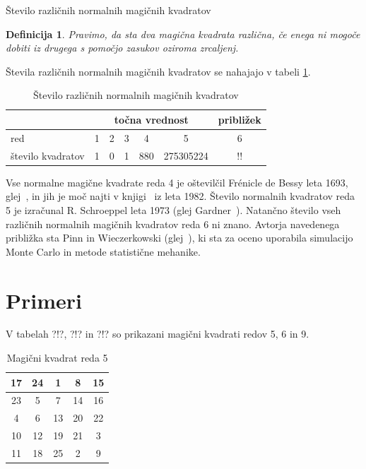 \documentclass[a4paper,12pt]{article}
\newtheorem{definicija}[izrek]{Definicija}
\begin{document}
Število različnih normalnih magičnih kvadratov

\begin{definicija}
      Pravimo, da sta dva magična kvadrata \emph{različna}, če enega ni mogoče dobiti
      iz drugega s pomočjo zasukov oziroma zrcaljenj.
\end{definicija}

Števila različnih normalnih magičnih kvadratov se nahajajo v tabeli \ref{table:stevila}.



\begin{table}
   \centering
   \caption{Število različnih normalnih magičnih kvadratov}
   \label{table:stevila}
   \begin{tabular}{lcccccc}\toprule
         & \multicolumn{5}{c}{točna vrednost} & približek\\
      \midrule
         red & 1 & 2 & 3 & 4 & 5 & 6\\
      število kvadratov & 1 & 0 & 1 & 880 & 275305224 & !!\\
      \bottomrule
\end{tabular}
\end{table}


Vse normalne magične kvadrate reda 4 je oštevilčil Frénicle de Bessy
leta 1693, glej~\cite{bessy}, in jih je moč najti v knjigi~\cite{berlekamp}
iz leta 1982. Število normalnih kvadratov reda 5 je izračunal
R. Schroeppel leta 1973 (glej Gardner~\cite{gardner}).
Natančno število vseh različnih normalnih magičnih kvadratov reda 6 ni znano.
Avtorja navedenega približka sta Pinn in Wieczerkowski (glej~\cite{pinn}), ki
sta za oceno uporabila simulacijo Monte Carlo in metode statistične mehanike.



\newpage

\section{Primeri}

V tabelah ?!?, ?!? in ?!? so prikazani
magični kvadrati redov 5, 6 in 9.

\begin{table}
   \centering
   \label{table:mag5}
   \caption{Magični kvadrat reda 5}
   \begin{tabular}{|c|c|c|c|c|}
   \hline
   17 & 24 &  1 &  8 & 15 \\\hline
   23 &  5 &  7 & 14 & 16 \\\hline
    4 &  6 & 13 & 20 & 22 \\\hline
   10 & 12 & 19 & 21 &  3 \\\hline
   11 & 18 & 25 &  2 &  9 \\\hline
   \end{tabular}
\end{table}
\end{document}
